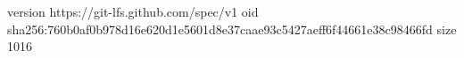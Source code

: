 version https://git-lfs.github.com/spec/v1
oid sha256:760b0af0b978d16e620d1e5601d8e37caae93c5427aeff6f44661e38c98466fd
size 1016

